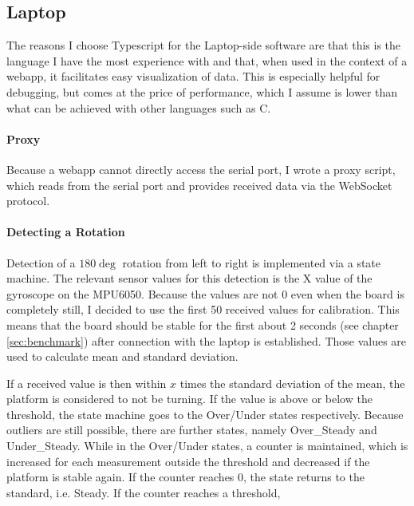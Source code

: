 \subsection{Laptop}
\label{subsec:laptop}

The reasons I choose Typescript for the Laptop-side software are that this is the language I have the most experience with and that, when used in the context of a webapp, it facilitates easy visualization of data.
This is especially helpful for debugging, but comes at the price of performance, which I assume is lower than what can be achieved with other languages such as C.

\paragraph{Proxy}
Because a webapp cannot directly access the serial port, I wrote a proxy script, which reads from the serial port and provides received data via the WebSocket protocol.

\paragraph{Detecting a Rotation}
Detection of a $180\deg$ rotation from left to right is implemented via a state machine.
The relevant sensor values for this detection is the X value of the gyroscope on the MPU6050.
Because the values are not 0 even when the board is completely still, I decided to use the first 50 received values for calibration.
This means that the board should be stable for the first about 2 seconds (see chapter \ref{sec:benchmark}) after connection with the laptop is established.
Those values are used to calculate mean and standard deviation.

If a received value is then within $x$ times the standard deviation of the mean, the platform is considered to not be turning.
If the value is above or below the threshold, the state machine goes to the Over/Under states respectively.
Because outliers are still possible, there are further states, namely Over_Steady and Under_Steady. 
While in the Over/Under states, a counter is maintained, which is increased for each measurement outside the threshold and decreased if the platform is stable again.
If the counter reaches 0, the state returns to the standard, i.e. Steady. If the counter reaches a threshold, 


